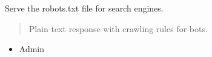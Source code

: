 \documentclass[letterpaper,10pt,english]{sphinxmanual}
\begin{document}
\begin{fulllineitems}
\label{\detokenize{index:core.views.robots_txt}}
\pysigstartsignatures
\pysiglinewithargsret
{}
{}
{}
\pysigstopsignatures
\sphinxAtStartPar
Serve the robots.txt file for search engines.
\begin{quote}\begin{description}
\sphinxAtStartPar
Plain text response with crawling rules for bots.

\end{description}\end{quote}

\end{fulllineitems}

\begin{itemize}
\item {} 
\sphinxAtStartPar
Admin

\end{itemize}
\label{\detokenize{index:module-core.apps}}
\end{document}
